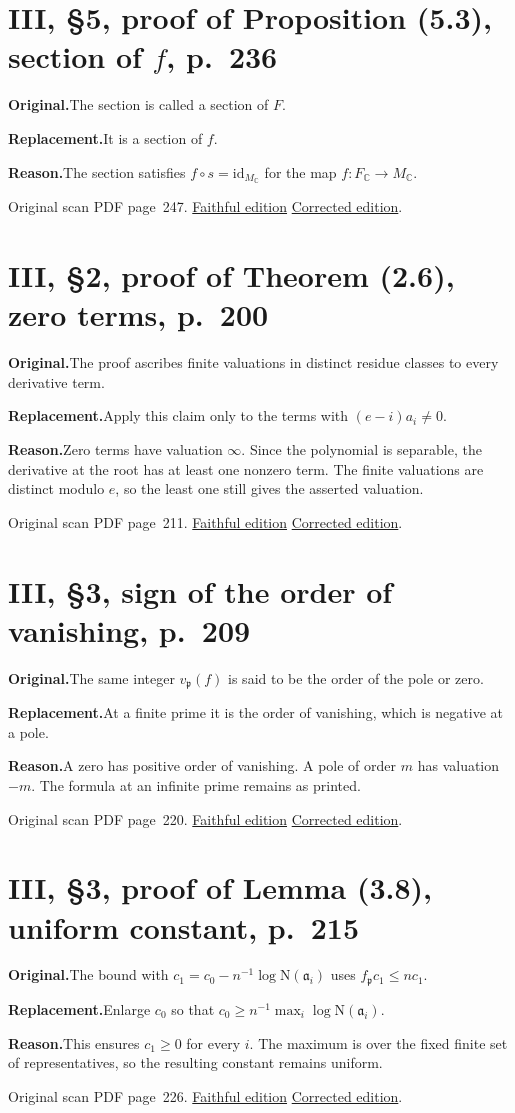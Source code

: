 \documentclass[11pt,a4paper]{article}
\newcommand{\original}{\par\smallskip\noindent\textbf{Original.}\enspace}
\newcommand{\replacement}{\par\smallskip\noindent\textbf{Replacement.}\enspace}
\newcommand{\reason}{\par\smallskip\noindent\textbf{Reason.}\enspace}
\newcommand{\editionlink}[3]{\href{#1\#errata.#2}{#3}}
\newcommand{\location}[2]{%
  \par\smallskip\noindent Original scan PDF page~#2.\enspace
  \editionlink{Neukirch_Faithful.pdf}{#1}{Faithful edition}
  \quad\editionlink{Neukirch_Corrected.pdf}{#1}{Corrected edition}.}
\begin{document}
\setcounter{section}{95}
\section{III, \S5, proof of Proposition (5.3), section of $f$, p.~236}\label{errata:item:96}

\original The section is called a section of $F$.
\replacement It is a section of $f$.
\reason The section satisfies $f\circ s=\mathrm{id}_{M_{\mathbb C}}$ for the map $f:F_{\mathbb C}\to M_{\mathbb C}$.
\location{96}{247}

\setcounter{section}{96}
\section{III, \S2, proof of Theorem (2.6), zero terms, p.~200}\label{errata:item:97}

\original The proof ascribes finite valuations in distinct residue classes to every derivative term.
\replacement Apply this claim only to the terms with $(e-i)a_i\ne0$.
\reason Zero terms have valuation $\infty$. Since the polynomial is separable, the derivative at the root has at least one nonzero term. The finite valuations are distinct modulo $e$, so the least one still gives the asserted valuation.
\location{97}{211}

\setcounter{section}{97}
\section{III, \S3, sign of the order of vanishing, p.~209}\label{errata:item:98}

\original The same integer $v_{\mathfrak p}(f)$ is said to be the order of the pole or zero.
\replacement At a finite prime it is the order of vanishing, which is negative at a pole.
\reason A zero has positive order of vanishing. A pole of order $m$ has valuation $-m$. The formula at an infinite prime remains as printed.
\location{98}{220}

\setcounter{section}{98}
\section{III, \S3, proof of Lemma (3.8), uniform constant, p.~215}\label{errata:item:99}

\original The bound with $c_1=c_0-n^{-1}\log\mathrm N(\mathfrak a_i)$ uses $f_{\mathfrak p}c_1\le nc_1$.
\replacement Enlarge $c_0$ so that $c_0\ge n^{-1}\max_i\log\mathrm N(\mathfrak a_i)$.
\reason This ensures $c_1\ge0$ for every $i$. The maximum is over the fixed finite set of representatives, so the resulting constant remains uniform.
\location{99}{226}
\end{document}
